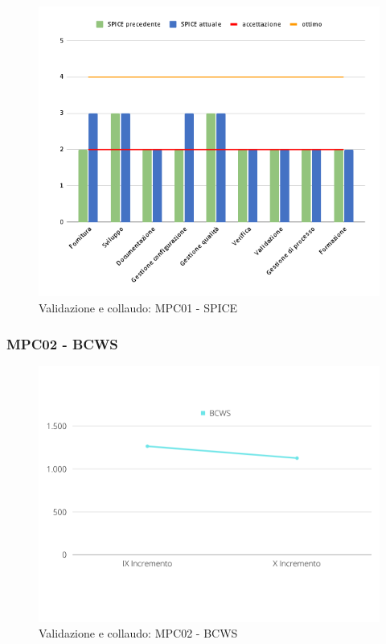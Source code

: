 \begin{figure}[H]
    \centering
    \includegraphics[scale=0.50]{Sezioni/images/vc-spice.png}
    \caption{Validazione e collaudo: MPC01 - SPICE}
\end{figure}

\subsubsection{MPC02 - BCWS}
\begin{figure}[H]
    \centering
    \includegraphics[scale=0.50]{Sezioni/images/vc-BCWS.png}
    \caption{Validazione e collaudo: MPC02 - BCWS}
\end{figure}

